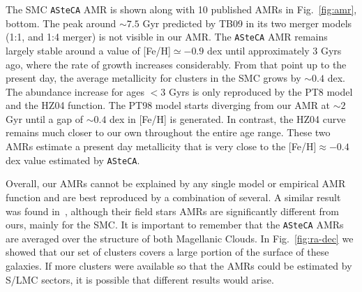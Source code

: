 \documentclass[draft]{aa}
\begin{document}
%
The SMC \texttt{ASteCA} AMR is shown along  with 10 published AMRs in
Fig.~\ref{fig:amr}, bottom.
%
%
The peak around ${\sim}7.5$ Gyr predicted by TB09 in its two merger models 
(1:1, and 1:4 merger) is not visible in our AMR.\@
%
The \texttt{ASteCA} AMR remains largely stable around a value of
[Fe/H]${\simeq-}0.9$ dex until approximately 3 Gyrs ago, where the rate of
growth increases considerably. From that point up to the present day, the
average metallicity for clusters in the SMC grows by ${\sim}0.4$ dex.
%
The abundance increase for ages ${<}3$ Gyrs is only reproduced by the PT8
model and the HZ04 function.
The PT98 model starts diverging from our AMR at ${\sim}2$ Gyr until a gap of
${\sim}0.4$ dex in [Fe/H] is generated. In contrast, the HZ04 curve remains
much closer to our own throughout the entire age range. These two AMRs estimate
a present day metallicity that is very close to the [Fe/H]${\approx}-0.4$ dex value
estimated by \texttt{ASteCA}.


Overall, our AMRs cannot be explained by any single model or empirical AMR
function and are best reproduced by a combination of several. A similar result
was found in~\cite{Piatti_Geisler_2013}, although their field stars AMRs are
significantly different from ours, mainly for the SMC.\@
%
It is important to remember that the \texttt{ASteCA} AMRs are averaged over the
structure of both Magellanic Clouds. In Fig.~\ref{fig:ra-dec} we showed that our
set of clusters covers a large portion of the surface of these galaxies.
%
If more clusters were available so that the AMRs could be estimated by S/LMC
sectors, it is possible that different results would arise.
\end{document}
